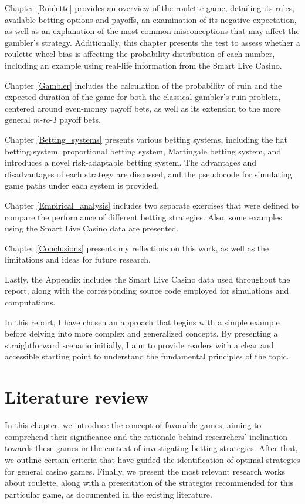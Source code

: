 \documentclass[11pt,twoside]{article}
\numberwithin{Theorem}{section}
\numberwithin{Definition}{section}
\numberwithin{Lemma}{section}
\numberwithin{Algorithm}{section}
\numberwithin{equation}{section}
\begin{document}
Chapter \ref{Roulette} provides an overview of the roulette game, detailing its rules, available betting options and payoffs, an examination of its negative expectation, as well as an explanation of the most common misconceptions that may affect the gambler's strategy. Additionally, this chapter presents the test to assess whether a roulette wheel bias is affecting the probability distribution of each number, including an example using real-life information from the Smart Live Casino.
 
Chapter \ref{Gambler} includes the calculation of the probability of ruin and the expected duration of the game for both the classical gambler's ruin problem, centered around even-money payoff bets, as well as its extension to the more general \textit{m-to-1} payoff bets.

Chapter \ref{Betting_systems} presents various betting systems, including the flat betting system, proportional betting system, Martingale betting system, and introduces a novel risk-adaptable betting system. The advantages and disadvantages of each strategy are discussed, and the pseudocode for simulating game paths under each system is provided.

Chapter \ref{Empirical_analysis} includes two separate exercises that were defined to compare the performance of different betting strategies. Also, some examples using the Smart Live Casino data are presented.

Chapter \ref{Conclusions} presents my reflections on this work, as well as the limitations and ideas for future research.

Lastly, the Appendix includes the Smart Live Casino data used throughout the report, along with the corresponding source code employed for simulations and computations.

In this report, I have chosen an approach that begins with a simple example before delving into more complex and generalized concepts. By presenting a straightforward scenario initially, I aim to provide readers with a clear and accessible starting point to understand the fundamental principles of the topic. 

\clearpage
\section{Literature review}\label{Literature_review}
In this chapter, we introduce the concept of favorable games, aiming to comprehend their significance and the rationale behind researchers' inclination towards these games in the context of investigating betting strategies. After that, we outline certain criteria that have guided the identification of optimal strategies for general casino games. Finally, we present the most relevant research works about roulette, along with a presentation of the strategies recommended for this particular game, as documented in the existing literature.
\end{document}
